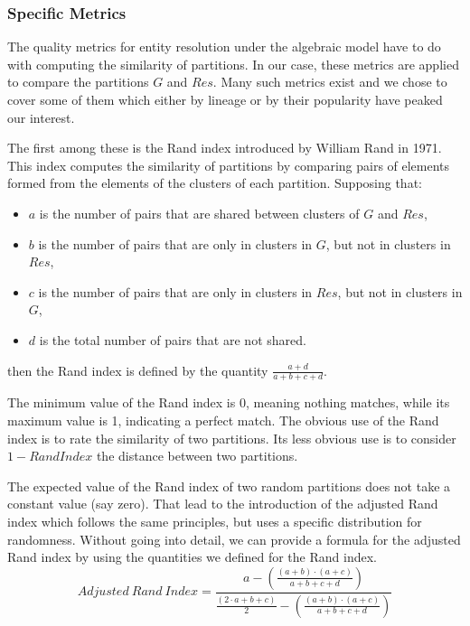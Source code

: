 \documentclass[11pt]{article}
\begin{document}
    \subsubsection[algeval]{Specific Metrics}\label{subsubsec:algeval}

    The quality metrics for entity resolution under the algebraic model have to
    do with computing the similarity of partitions.
    In our case, these metrics are applied to compare the partitions $G$ and
    $Res$.
    Many such metrics exist\cite{hitesh2012} and we chose to cover some of them
    which either by lineage or by their popularity have peaked our interest.

    The first among these is the Rand index introduced by William Rand in
    1971\cite{rand1971}.
    This index computes the similarity of partitions by comparing pairs of
    elements formed from the elements of the clusters of each partition.
    Supposing that:
    \begin{itemize}
        \item $a$ is the number of pairs that are shared between clusters of $G$
        and $Res$,
        \item $b$ is the number of pairs that are only in clusters in $G$, but
        not in clusters in $Res$,
        \item $c$ is the number of pairs that are only in clusters in $Res$, but
        not in clusters in $G$,
        \item $d$ is the total number of pairs that are not shared.
    \end{itemize}
    then the Rand index is defined by the quantity
    $\frac{a+d}{a+b+c+d}$\cite{adjrand2001}.

    The minimum value of the Rand index is 0, meaning nothing matches, while its
    maximum value is 1, indicating a perfect match.
    The obvious use of the Rand index is to rate the similarity of two
    partitions.
    Its less obvious use is to consider $1 - Rand Index$ the distance between
    two partitions.

    The expected value of the Rand index of two random partitions does not take
    a constant value (say zero)\cite{adjrand2001}.
    That lead to the introduction of the adjusted Rand index which follows the
    same principles, but uses a specific distribution for
    randomness\cite{adjrand1985}.
    Without going into detail, we can provide a formula for the adjusted Rand
    index by using the quantities we defined for the Rand index\cite{Tal11}.
    \[
        Adjusted~Rand~Index = \frac{
            a - (\frac{(a+b)\cdot(a+c)}{a+b+c+d})
        }{
            \frac{(2\cdot a+b+c)}{2}-(\frac{(a+b)\cdot(a+c)}{a+b+c+d})
        }
    \]
\end{document}
